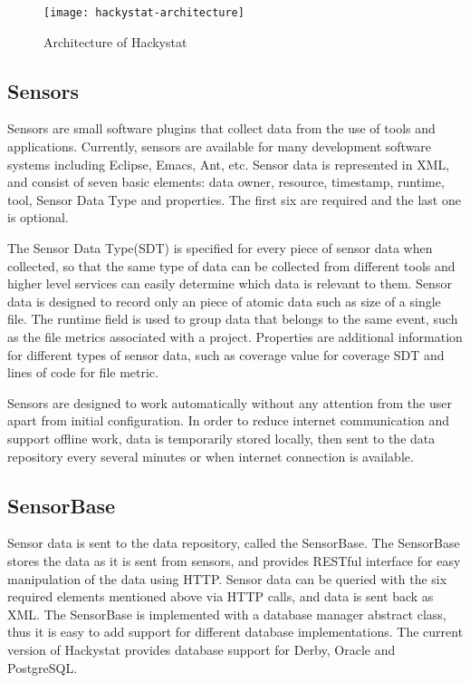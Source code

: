 \begin{figure}[htbp]
   \centering
   \texttt{[image: hackystat-architecture]} 
   \caption{Architecture of Hackystat}
   \label{fig:hackystat-architecture}
\end{figure}

\subsection{Sensors}
Sensors are small software plugins that collect data from the use of tools and applications. Currently, sensors are available for many development software systems including Eclipse, Emacs, Ant, etc. Sensor data is represented in XML, and consist of seven basic elements: data owner, resource, timestamp, runtime, tool, Sensor Data Type and properties. The first six are required and the last one is optional. 

The Sensor Data Type(SDT) is specified for every piece of sensor data when collected, so that the same type of data can be collected from different tools and higher level services can easily determine which data is relevant to them. Sensor data is designed to record only an piece of atomic data such as size of a single file. The runtime field is used to group data that belongs to the same event, such as the file metrics associated with a project. Properties are additional information for different types of sensor data, such as coverage value for coverage SDT and lines of code for file metric. 

Sensors are designed to work automatically without any attention from the user apart from initial configuration. In order to reduce internet communication and support offline work, data is temporarily stored locally, then sent to the data repository every several minutes or when internet connection is available.

\subsection{SensorBase}
Sensor data is sent to the data repository, called the SensorBase. The SensorBase stores the data as it is sent from sensors, and provides RESTful interface for easy manipulation of the data using HTTP. Sensor data can be queried with the six required elements mentioned above via HTTP calls, and data is sent back as XML. The SensorBase is implemented with a database manager abstract class, thus it is easy to add support for different database implementations. The current version of Hackystat provides database support for Derby, Oracle and PostgreSQL.


